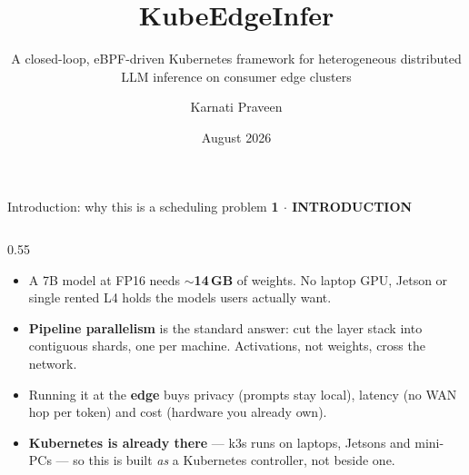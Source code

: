 \documentclass[aspectratio=169,9pt]{beamer}
\title{KubeEdgeInfer}
\subtitle{A closed-loop, eBPF-driven Kubernetes framework for heterogeneous
distributed LLM inference on consumer edge clusters}
\author{Karnati Praveen}
\institute{\texttt{github.com/karnati-praveen/ebpf-}}
\date{August 2026}
\newcommand{\kicker}[1]{{\scriptsize\color{keBlue}\bfseries\MakeUppercase{#1}}\par\vspace{0.2em}}
\newcommand{\hl}[1]{\textbf{\color{keNavy}#1}}
\begin{document}

\begin{frame}[shrink=25]{Introduction: why this is a scheduling problem}
  \kicker{1 $\cdot$ Introduction}
  \small
  \begin{columns}[T]
    \begin{column}{0.55\textwidth}
      \begin{itemize}\setlength\itemsep{0.45em}
        \item A 7B model at FP16 needs ${\sim}$\hl{14\,GB} of weights. No laptop
          GPU, Jetson or single rented L4 holds the models users actually want.
        \item \hl{Pipeline parallelism} is the standard answer: cut the layer
          stack into contiguous shards, one per machine. Activations, not
          weights, cross the network.
        \item Running it at the \hl{edge} buys privacy (prompts stay local),
          latency (no WAN hop per token) and cost (hardware you already own).
        \item \hl{Kubernetes is already there} --- k3s runs on laptops, Jetsons
          and mini-PCs --- so this is built \emph{as} a Kubernetes controller,
          not beside one.
      \end{itemize}
      \vspace{0.5em}
      \centering
\end{column}
\end{columns}
\end{frame}
\end{document}
